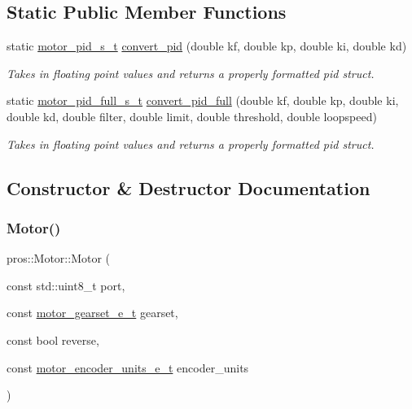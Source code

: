 \subsection*{Static Public Member Functions}
\begin{DoxyCompactItemize}
\item 
static \hyperlink{motors_8h_ad2e907c8d7ce53c1fd91f1b9801072e3}{motor\+\_\+pid\+\_\+s\+\_\+t} \hyperlink{classpros_1_1Motor_adca7af38b0357c254e81ed882a2283a0}{convert\+\_\+pid} (double kf, double kp, double ki, double kd)
\begin{DoxyCompactList}\small\item\em Takes in floating point values and returns a properly formatted pid struct. \end{DoxyCompactList}\item 
static \hyperlink{motors_8h_a0295cbf49f5c70c17b5fa962bd25febd}{motor\+\_\+pid\+\_\+full\+\_\+s\+\_\+t} \hyperlink{classpros_1_1Motor_a2d8c9c462e47e989ebe64fa341be91c6}{convert\+\_\+pid\+\_\+full} (double kf, double kp, double ki, double kd, double filter, double limit, double threshold, double loopspeed)
\begin{DoxyCompactList}\small\item\em Takes in floating point values and returns a properly formatted pid struct. \end{DoxyCompactList}\end{DoxyCompactItemize}


\subsection{Constructor \& Destructor Documentation}
\mbox{\label{classpros_1_1Motor_a5be9a41f9877208c887d5e2c081bc72e}} 
\subsubsection{\texorpdfstring{Motor()}{Motor()}\hspace{0.1cm}{\footnotesize\ttfamily [1/5]}}
{\footnotesize\ttfamily pros\+::\+Motor\+::\+Motor (\begin{DoxyParamCaption}\item[{const std\+::uint8\+\_\+t}]{port,  }\item[{const \hyperlink{motors_8h_aa2f1c305c998abc3bf8dd1f76fa4da8b}{motor\+\_\+gearset\+\_\+e\+\_\+t}}]{gearset,  }\item[{const bool}]{reverse,  }\item[{const \hyperlink{motors_8h_a6677ba23760c558fd8b7b4e1e00a6123}{motor\+\_\+encoder\+\_\+units\+\_\+e\+\_\+t}}]{encoder\+\_\+units }\end{DoxyParamCaption})\hspace{0.3cm}{\ttfamily [explicit]}}



